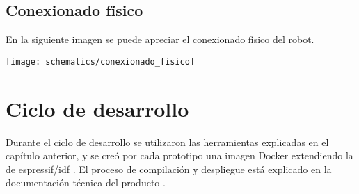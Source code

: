 \subsection{Conexionado físico}

En la siguiente imagen se puede apreciar el conexionado fisico del robot.

\begin{center}
\texttt{[image: schematics/conexionado\_fisico]}
  \label{fig:conexionado_fisico}
\end{center}




\section{Ciclo de desarrollo}

Durante el ciclo de desarrollo se utilizaron las herramientas explicadas en el capítulo anterior, y se creó por cada prototipo una imagen Docker extendiendo la de espressif/idf \cite{Espressif_docker_image}. El proceso de compilación y despliegue está explicado en la documentación técnica del producto \cite{Robot_Tecnical_doc}.










